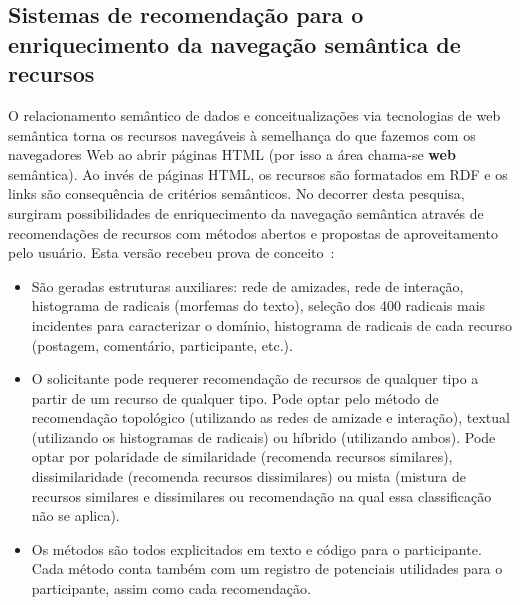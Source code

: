 \documentclass[a4paper,openright,12pt]{report} %
\begin{document}
\subsection{Sistemas de recomendação para o enriquecimento da navegação semântica de recursos}
O relacionamento semântico de dados e conceitualizações via tecnologias de web semântica 
torna os recursos navegáveis à semelhança do que fazemos com os navegadores Web
ao abrir páginas HTML (por isso a área chama-se {\bf web} semântica).
Ao invés de páginas HTML, os recursos são formatados em RDF e os links são
consequência de critérios semânticos.
No decorrer desta pesquisa, surgiram possibilidades de enriquecimento
da navegação semântica através de recomendações de recursos com
métodos abertos e propostas de aproveitamento pelo usuário.
Esta versão recebeu prova de conceito~\cite{pnud4}:
\begin{itemize}
    \item São geradas estruturas auxiliares: rede de amizades, rede de interação, histograma de radicais (morfemas do texto),
        seleção dos 400 radicais
        mais incidentes para caracterizar o domínio,
        histograma de radicais de cada recurso 
        (postagem, comentário, participante, etc.).
    \item O solicitante pode requerer recomendação de recursos
        de qualquer tipo a partir de um recurso de qualquer
        tipo. Pode optar pelo método de recomendação topológico (utilizando as redes de amizade e interação),
        textual (utilizando os histogramas de radicais) ou híbrido (utilizando ambos).
        Pode optar por polaridade de similaridade (recomenda recursos similares),
        dissimilaridade (recomenda recursos dissimilares) ou
        mista (mistura de recursos similares e dissimilares ou recomendação na qual essa classificação não se aplica).
    \item Os métodos são todos explicitados em texto e código
        para o participante. Cada método conta também com um
        registro de potenciais utilidades para o participante,
        assim como cada recomendação.
\end{itemize}
\end{document}
